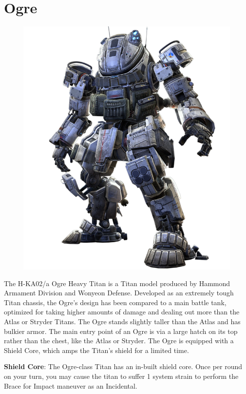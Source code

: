 \documentclass[9pt, openany]{extbook}
\begin{document}
\section{Ogre}
\label{sec:ogre}
\begin{figure}
\vspace*{-2em}
\includegraphics[width=\linewidth]{Ogre}
\end{figure}

The H-KA02/a Ogre Heavy Titan is a Titan model produced by Hammond Armament Division and Wonyeon Defense. Developed as an extremely tough Titan chassis, the Ogre's design has been compared to a main battle tank, optimized for taking higher amounts of damage and dealing out more than the Atlas or Stryder Titans. The Ogre stands slightly taller than the Atlas and has bulkier armor. The main entry point of an Ogre is via a large hatch on its top rather than the chest, like the Atlas or Stryder. The Ogre is equipped with a Shield Core, which amps the Titan's shield for a limited time.

\textbf{Shield Core}: The Ogre-class Titan has an in-built shield core. Once per round on your turn, you may cause the titan to suffer 1 system strain to perform the Brace for Impact maneuver as an Incidental.\\[3em]
\end{document}
